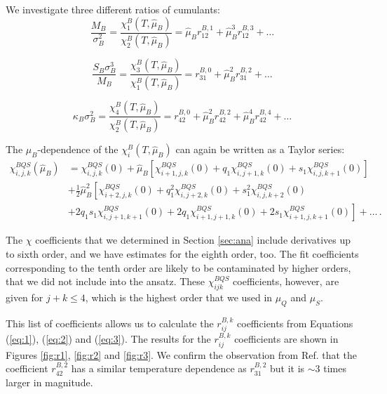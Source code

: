 \documentclass[a4paper,11pt]{article}
\begin{document}
We investigate three different ratios of cumulants:
\begin{equation}
  \frac{M_B}{\sigma^2_B} = \frac{\chi^B_1(T,\hat \mu_B)}{\chi^B_2(T,\hat \mu_B)}= \hat \mu_B r_{12}^{B,1} + \hat \mu_B^3 r_{12}^{B,3} + \ldots \label{eq:1}
 \end{equation}
 
 \begin{equation}
  \frac{S_B \sigma_B^3}{M_B} = \frac{\chi^B_3(T,\hat \mu_B)}{\chi^B_1(T,\hat \mu_B)}= r_{31}^{B,0} + \hat \mu_B^2 r_{31}^{B,2} + \ldots \label{eq:2}
 \end{equation}
 
 \begin{equation}
  \kappa_B  \sigma^2_B= \frac{\chi^B_4(T,\hat \mu_B)}{\chi^B_2(T,\hat \mu_B)}= r_{42}^{B,0} + \hat \mu_B^2 r_{42}^{B,2} +  \hat \mu_B^4 r_{42}^{B,4} + \ldots
\label{eq:3}
 \end{equation}
 
The $\mu_B$-dependence of the $\chi^B_i(T,\hat \mu_B)$ can again be written as a Taylor series:
 \begin{align}
\chi^{BQS}_{i,j,k} (\hat\mu_B) &=
\chi^{BQS}_{i,j,k} (0) 
+ \hat\mu_B \left [\chi^{BQS}_{i+1,j,k}(0) 
+ q_1\chi^{BQS}_{i,j+1,k}(0) 
+ s_1 \chi^{BQS}_{i,j,k+1}(0)  \right]
\nonumber\\
&+
\frac12 \hat\mu_B^2 \left [
  \chi^{BQS}_{i+2,j,k}(0) 
  + q_1^2 \chi^{BQS}_{i,j+2,k}(0) 
  + s_1^2 \chi^{BQS}_{i,j,k+2}(0)  \right.
  \nonumber\\
&
\left.
  + 2 q_1 s_1 \chi^{BQS}_{i,j+1,k+1}(0) 
  + 2 q_1 \chi^{BQS}_{i+1,j+1,k}(0) 
  + 2 s_1 \chi^{BQS}_{i+1,j,k+1}(0) 
\right]+\dots\,.
\label{eq:4}
\end{align}

The $\chi$ coefficients that we determined in Section \ref{sec:ana} include derivatives
up to sixth order, and we have estimates for the eighth order, too. The fit coefficients 
corresponding to the tenth order are likely to be contaminated by higher orders, that
we did not include into the ansatz. These $\chi^{BQS}_{ijk}$ coefficients, however,
are given for $j+k\le4$, which is the highest order that we used in  $\mu_Q$ and $\mu_S$.

This list of coefficients allows us to calculate the $r^{B,k}_{ij}$
coefficients from Equations (\ref{eq:1}), (\ref{eq:2}) and (\ref{eq:3}). 
The results for the  $r^{B,k}_{ij}$ coefficients are shown in Figures \ref{fig:r1},  \ref{fig:r2} and \ref{fig:r3}. 
We confirm the observation from Ref. \cite{Bazavov:2017tot} that the coefficient $r^{B,2}_{42}$
has a similar temperature dependence as $r^{B,2}_{31}$ but it is $\sim3$ times larger in magnitude.
\end{document}
